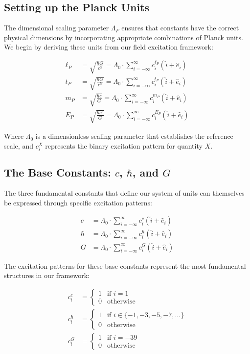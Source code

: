 \documentclass{article}
\begin{document}
\subsection{Setting up the Planck Units}

The dimensional scaling parameter $\Lambda_F$ ensures that constants have the correct physical dimensions by incorporating appropriate combinations of Planck units. We begin by deriving these units from our field excitation framework:

\begin{align}
\ell_P &= \sqrt{\frac{\hbar G}{c^3}} = \Lambda_0 \cdot \sum_{i=-\infty}^{\infty} c_i^{\ell_P} (\hat{i} + \hat{e}_i)\\
t_P &= \sqrt{\frac{\hbar G}{c^5}} = \Lambda_0 \cdot \sum_{i=-\infty}^{\infty} c_i^{t_P} (\hat{i} + \hat{e}_i)\\
m_P &= \sqrt{\frac{\hbar c}{G}} = \Lambda_0 \cdot \sum_{i=-\infty}^{\infty} c_i^{m_P} (\hat{i} + \hat{e}_i)\\
E_P &= \sqrt{\frac{\hbar c^5}{G}} = \Lambda_0 \cdot \sum_{i=-\infty}^{\infty} c_i^{E_P} (\hat{i} + \hat{e}_i)
\end{align}

Where $\Lambda_0$ is a dimensionless scaling parameter that establishes the reference scale, and $c_i^X$ represents the binary excitation pattern for quantity $X$.

\subsection{The Base Constants: $c$, $\hbar$, and $G$}

The three fundamental constants that define our system of units can themselves be expressed through specific excitation patterns:

\begin{align}
c &= \Lambda_0 \cdot \sum_{i=-\infty}^{\infty} c_i^c (\hat{i} + \hat{e}_i)\\
\hbar &= \Lambda_0 \cdot \sum_{i=-\infty}^{\infty} c_i^{\hbar} (\hat{i} + \hat{e}_i)\\
G &= \Lambda_0 \cdot \sum_{i=-\infty}^{\infty} c_i^G (\hat{i} + \hat{e}_i)
\end{align}

The excitation patterns for these base constants represent the most fundamental structures in our framework:

\begin{align}
c_i^c &= \begin{cases}
1 & \text{if } i = 1 \\
0 & \text{otherwise}
\end{cases}\\
c_i^{\hbar} &= \begin{cases}
1 & \text{if } i \in \{-1, -3, -5, -7, \ldots\} \\
0 & \text{otherwise}
\end{cases}\\
c_i^G &= \begin{cases}
1 & \text{if } i = -39 \\
0 & \text{otherwise}
\end{cases}
\end{align}
\end{document}

